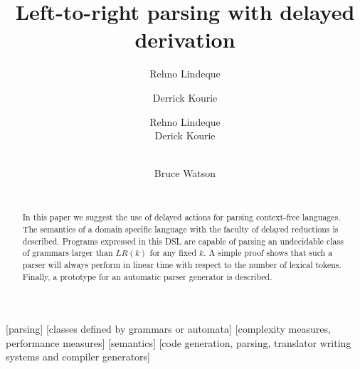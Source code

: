 \documentclass[A4]{sig-alternate}
\begin{document}
\setcounter{page}{1}
%
\crdata{} %

\title{Left-to-right parsing with delayed derivation}
\author{Rehno Lindeque \and Derrick Kourie}


\author{
\alignauthor 
Rehno Lindeque\\
\alignauthor
Derick Kourie\\
\\
\and
\alignauthor
Bruce Watson\\
\\
}

\maketitle

\begin{abstract}
In this paper we suggest the use of delayed actions for parsing context-free languages.
The semantics of a domain specific language with the faculty of delayed reductions is described.
Programs expressed in this DSL are capable of parsing an undecidable class of grammars larger than $LR(k)$ for any fixed $k$.
A simple proof shows that such a parser will always perform in linear time with respect to the number of lexical tokens.
Finally, a prototype for an automatic parser generator is described.
\end{abstract}

[parsing]
[classes defined by grammars or automata]
[complexity measures, performance measures]
[semantics]
[code generation, parsing, translator writing systems and compiler generators]
\end{document}
